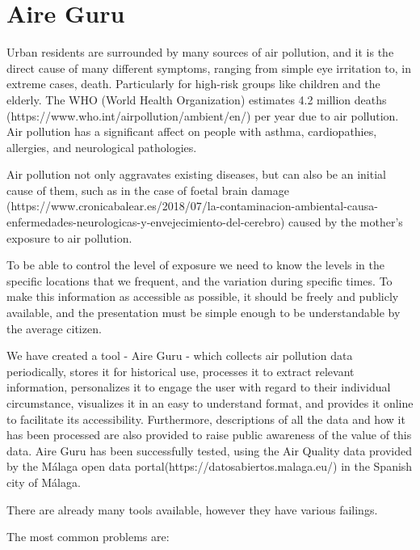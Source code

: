 \newpage
\section{Aire Guru}

Urban residents are surrounded by many sources of air pollution, and it is the direct cause of many different symptoms,
ranging from simple eye irritation 
to, in extreme cases, death. Particularly for high-risk groups like children and the elderly.
The WHO (World Health Organization) estimates 4.2 million deaths
(https://www.who.int/airpollution/ambient/en/) per year due to air pollution.
Air pollution has a significant affect on people with asthma, cardiopathies, allergies, and neurological pathologies.

Air pollution not only aggravates existing diseases, but can also be an initial cause of them, such as in the case of foetal brain
damage (https://www.cronicabalear.es/2018/07/la-contaminacion-ambiental-causa-enfermedades-neurologicas-y-envejecimiento-del-cerebro)
caused by the mother's exposure to air pollution.

To be able to control the level of exposure we need to know the levels
in the specific locations that we frequent, and the variation during specific times.
To make this information as accessible as possible, it should be freely and publicly available, and the presentation
must be simple enough to be understandable by the average citizen.

We have created a tool - Aire Guru - which collects air pollution data periodically, stores it for historical use, 
processes it to extract relevant information, personalizes it to engage the user with regard to their individual
circumstance, visualizes it in an easy to understand format, and provides it online to facilitate its accessibility. Furthermore,
descriptions of all the data and how it has been processed are also provided to raise public awareness of the value
of this data. Aire Guru has been successfully tested, using the Air Quality data provided
by the Málaga open data portal(https://datosabiertos.malaga.eu/) in the Spanish city of Málaga.

There are already many tools available, however they have various failings.

The most common problems are:

